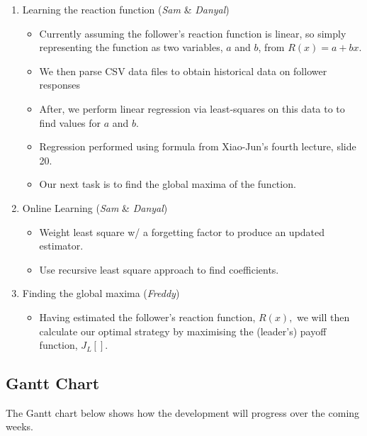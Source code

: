 \documentclass[10pt,a4paper]{report}
\begin{document}
\begin{enumerate}
  \item Learning the reaction function (\emph{Sam} \& \emph{Danyal})
    \begin{itemize}
      \item Currently assuming the follower's reaction function is linear, so simply representing the function as two variables, $a$ and $b$, from $R(x) = a + bx$.
      \item We then parse CSV data files to obtain historical data on follower responses
      \item After, we perform linear regression via least-squares on this data to to find values for $a$ and $b$.
      \item Regression performed using formula from Xiao-Jun's fourth lecture, slide 20.
      \item Our next task is to find the global maxima of the function.
    \end{itemize}
  \item{Online Learning (\emph{Sam} \& \emph{Danyal})}
    \begin{itemize}
      \item Weight least square w/ a forgetting factor to produce an updated estimator.
      \item Use recursive least square approach to find coefficients.
    \end{itemize}

  \item Finding the global maxima (\emph{Freddy})
    \begin{itemize}
      \item Having estimated the follower's reaction function, $R(x),$ we will then calculate our optimal strategy by maximising the (leader's) payoff function, $J_L[]$.
    \end{itemize}
\end{enumerate}

\subsection{Gantt Chart}
The Gantt chart below shows how the development will progress over the coming weeks.
\end{document}
